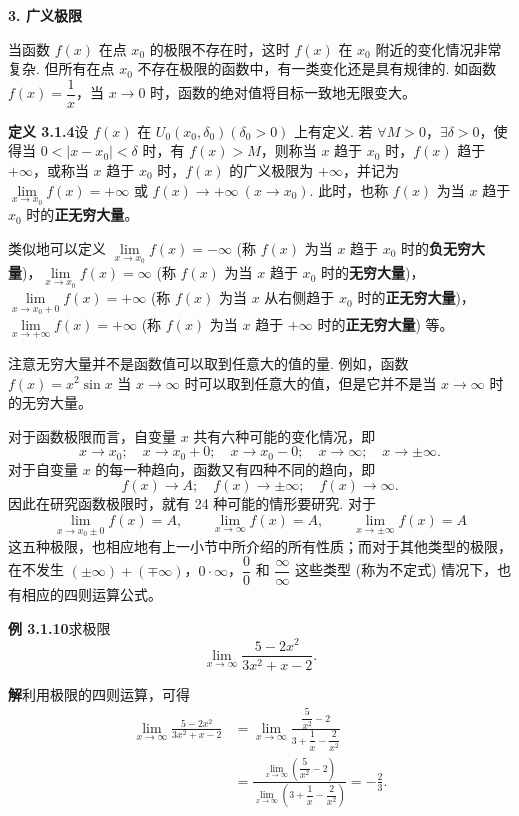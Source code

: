 \documentclass[UTF8, 12pt, fontset=fandol, oneside]{ctexart}
\begin{document}
\noindent\textbf{3. 广义极限}

当函数 $f(x)$ 在点 $x_0$ 的极限不存在时，这时 $f(x)$ 在 $x_0$ 附近的变化情况非常复杂. 但所有在点 $x_0$ 不存在极限的函数中，有一类变化还是具有规律的. 如函数 $f(x)=\dfrac1x$，当 $x\to0$ 时，函数的绝对值将目标一致地无限变大。

\noindent\textbf{定义 3.1.4}\quad 设 $f(x)$ 在 $U_0(x_0,\delta_0)(\delta_0>0)$ 上有定义. 若 $\forall M>0$，$\exists\delta>0$，使得当 $0<|x-x_0|<\delta$ 时，有 $f(x)>M$，则称当 $x$ 趋于 $x_0$ 时，$f(x)$ 趋于 $+\infty$，或称当 $x$ 趋于 $x_0$ 时，$f(x)$ 的广义极限为 $+\infty$，并记为 $\lim\limits_{x\to x_0}f(x)=+\infty$ 或 $f(x)\to+\infty\ (x\to x_0)$. 此时，也称 $f(x)$ 为当 $x$ 趋于 $x_0$ 时的\textbf{正无穷大量}。

类似地可以定义 $\lim\limits_{x\to x_0}f(x)=-\infty$ (称 $f(x)$ 为当 $x$ 趋于 $x_0$ 时的\textbf{负无穷大量})，$\lim\limits_{x\to x_0}f(x)=\infty$ (称 $f(x)$ 为当 $x$ 趋于 $x_0$ 时的\textbf{无穷大量})，$\lim\limits_{x\to x_0+0}f(x)=+\infty$ (称 $f(x)$ 为当 $x$ 从右侧趋于 $x_0$ 时的\textbf{正无穷大量})，$\lim\limits_{x\to+\infty}f(x)=+\infty$ (称 $f(x)$ 为当 $x$ 趋于 $+\infty$ 时的\textbf{正无穷大量}) 等。

注意无穷大量并不是函数值可以取到任意大的值的量. 例如，函数 $f(x)=x^2\sin x$ 当 $x\to\infty$ 时可以取到任意大的值，但是它并不是当 $x\to\infty$ 时的无穷大量。

对于函数极限而言，自变量 $x$ 共有六种可能的变化情况，即
\[
  x\to x_0;\quad x\to x_0+0;\quad x\to x_0-0;\quad x\to\infty;\quad x\to\pm\infty.
\]
对于自变量 $x$ 的每一种趋向，函数又有四种不同的趋向，即
\[
  f(x)\to A;\quad f(x)\to\pm\infty;\quad f(x)\to\infty.
\]
因此在研究函数极限时，就有 24 种可能的情形要研究. 对于
\[
  \lim_{x\to x_0\pm0}f(x)=A,\qquad
  \lim_{x\to\infty}f(x)=A,\qquad
  \lim_{x\to\pm\infty}f(x)=A
\]
这五种极限，也相应地有上一小节中所介绍的所有性质；而对于其他类型的极限，在不发生 $(\pm\infty)+(\mp\infty)$，$0\cdot\infty$，$\dfrac00$ 和 $\dfrac{\infty}{\infty}$ 这些类型 (称为不定式) 情况下，也有相应的四则运算公式。

\noindent\textbf{例 3.1.10}\quad 求极限
\[
  \lim_{x\to\infty}\frac{5-2x^2}{3x^2+x-2}.
\]

\noindent\textbf{解}\quad 利用极限的四则运算，可得
\[
\begin{aligned}
  \lim_{x\to\infty}\frac{5-2x^2}{3x^2+x-2}
  &=\lim_{x\to\infty}\frac{\dfrac5{x^2}-2}{3+\dfrac1x-\dfrac2{x^2}}\\
  &=\frac{\lim\limits_{x\to\infty}\left(\dfrac5{x^2}-2\right)}
  {\lim\limits_{x\to\infty}\left(3+\dfrac1x-\dfrac2{x^2}\right)}
  =-\frac23.
\end{aligned}
\]
\end{document}
